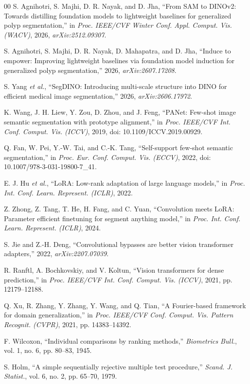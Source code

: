 \documentclass{ieeeaccess}
\begin{document}
\begin{thebibliography}{00}
 S. Agnihotri, S. Majhi, D. R. Nayak, and D. Jha, ``From SAM to DINOv2: Towards distilling foundation models to lightweight baselines for generalized polyp segmentation,'' in \emph{Proc. IEEE/CVF Winter Conf. Appl. Comput. Vis. (WACV)}, 2026, \emph{arXiv:2512.09307}.


 S. Agnihotri, S. Majhi, D. R. Nayak, D. Mahapatra, and D. Jha, ``Induce to empower: Improving lightweight baselines via foundation model induction for generalized polyp segmentation,'' 2026, \emph{arXiv:2607.17208}.


 S. Yang \emph{et al.}, ``SegDINO: Introducing multi-scale structure into DINO for efficient medical image segmentation,'' 2026, \emph{arXiv:2606.17972}.


 K. Wang, J. H. Liew, Y. Zou, D. Zhou, and J. Feng, ``PANet: Few-shot image semantic segmentation with prototype alignment,'' in \emph{Proc. IEEE/CVF Int. Conf. Comput. Vis. (ICCV)}, 2019, doi: 10.1109/ICCV.2019.00929.


 Q. Fan, W. Pei, Y.-W. Tai, and C.-K. Tang, ``Self-support few-shot semantic segmentation,'' in \emph{Proc. Eur. Conf. Comput. Vis. (ECCV)}, 2022, doi: 10.1007/978-3-031-19800-7\_41.


 E. J. Hu \emph{et al.}, ``LoRA: Low-rank adaptation of large language models,'' in \emph{Proc. Int. Conf. Learn. Represent. (ICLR)}, 2022.


 Z. Zhong, Z. Tang, T. He, H. Fang, and C. Yuan, ``Convolution meets LoRA: Parameter efficient finetuning for segment anything model,'' in \emph{Proc. Int. Conf. Learn. Represent. (ICLR)}, 2024.

 S. Jie and Z.-H. Deng, ``Convolutional bypasses are better vision transformer adapters,'' 2022, \emph{arXiv:2207.07039}.


 R. Ranftl, A. Bochkovskiy, and V. Koltun, ``Vision transformers for dense prediction,'' in \emph{Proc. IEEE/CVF Int. Conf. Comput. Vis. (ICCV)}, 2021, pp. 12179--12188.


 Q. Xu, R. Zhang, Y. Zhang, Y. Wang, and Q. Tian, ``A Fourier-based framework for domain generalization,'' in \emph{Proc. IEEE/CVF Conf. Comput. Vis. Pattern Recognit. (CVPR)}, 2021, pp. 14383--14392.


 F. Wilcoxon, ``Individual comparisons by ranking methods,'' \emph{Biometrics Bull.}, vol. 1, no. 6, pp. 80--83, 1945.

 S. Holm, ``A simple sequentially rejective multiple test procedure,'' \emph{Scand. J. Statist.}, vol. 6, no. 2, pp. 65--70, 1979.



\end{thebibliography}
\end{document}

